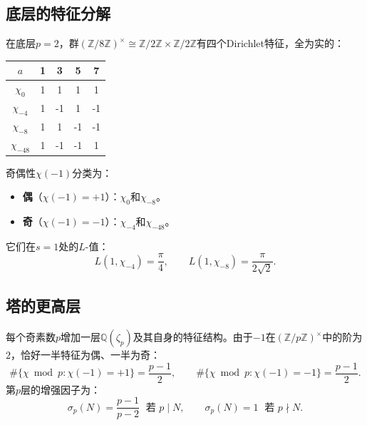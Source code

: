 \documentclass[11pt,a4paper]{article}
\theoremstyle{remark}
\newcommand{\Z}{\mathbb{Z}}
\newcommand{\Q}{\mathbb{Q}}
\begin{document}
\subsection{底层的特征分解}
\label{subsec:character-decomp}

在底层$p=2$，群$(\Z/8\Z)^\times \cong \Z/2\Z \times \Z/2\Z$有四个Dirichlet特征，全为实的：

\medskip
\begin{center}
\begin{tabular}{c|cccc}
$a$ & 1 & 3 & 5 & 7 \\
\hline
$\chi_0$     &  1 &  1 &  1 &  1 \\
$\chi_{-4}$  &  1 & -1 &  1 & -1 \\
$\chi_{-8}$  &  1 &  1 & -1 & -1 \\
$\chi_{-48}$ &  1 & -1 & -1 &  1 \\
\end{tabular}
\end{center}
\medskip

奇偶性$\chi(-1)$分类为：
\begin{itemize}[nosep]
  \item \textbf{偶}（$\chi(-1)=+1$）：$\chi_0$和$\chi_{-8}$。
  \item \textbf{奇}（$\chi(-1)=-1$）：$\chi_{-4}$和$\chi_{-48}$。
\end{itemize}
它们在$s=1$处的$L$-值：
\begin{equation}
\label{eq:L-values}
  L(1,\chi_{-4}) = \frac{\pi}{4}, \qquad
  L(1,\chi_{-8}) = \frac{\pi}{2\sqrt{2}}.
\end{equation}

\subsection{塔的更高层}
\label{subsec:higher-layers}

每个奇素数$p$增加一层$\Q(\zeta_p)$及其自身的特征结构。由于$-1$在$(\Z/p\Z)^\times$中的阶为$2$，恰好一半特征为偶、一半为奇：
\begin{equation}
\label{eq:char-split}
  \#\{\chi \bmod p : \chi(-1) = +1\} = \frac{p-1}{2}, \qquad
  \#\{\chi \bmod p : \chi(-1) = -1\} = \frac{p-1}{2}.
\end{equation}
第$p$层的增强因子为：
\begin{equation}
\label{eq:enhancement}
  \sigma_p(N) = \frac{p-1}{p-2} \;\text{ 若 } p \mid N, \qquad
  \sigma_p(N) = 1 \;\text{ 若 } p \nmid N.
\end{equation}
\end{document}
